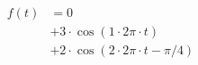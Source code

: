 \begin{center}
\begin{align*}
f(t) &= 0 \\
&+ 3 \cdot \cos( 1 \cdot 2 \pi \cdot t ) \\
&+ 2 \cdot \cos( 2 \cdot 2 \pi \cdot t - \pi/4)
\end{align*}
\end{center}
